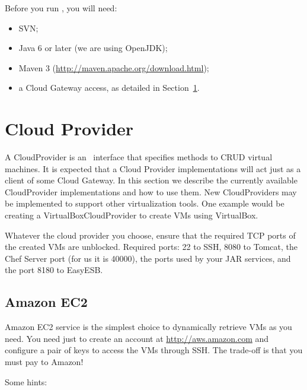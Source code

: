 Before you run \ee, you will need:

\begin{itemize}
\item SVN;
\item Java 6 or later (we are using OpenJDK);
\item Maven 3  (\url{http://maven.apache.org/download.html});
\item a Cloud Gateway access, as detailed in Section~\ref{sec:cloud}.
\end{itemize}

\section{Cloud Provider}
\label{sec:cloud}

A \textsf{CloudProvider} is an \ee\ interface that specifies methods to CRUD virtual machines. It is expected that a \textsf{Cloud Provider} implementations will act just as a client of some Cloud Gateway. In this section we describe the currently available \textsf{CloudProvider} implementations and how to use them. New \textsf{CloudProvider}s may be implemented to support other virtualization tools. One example would be creating a \textsf{VirtualBoxCloudProvider} to create VMs using VirtualBox.

Whatever the cloud provider you choose, ensure that the required TCP ports of the created VMs are unblocked. Required ports: 22 to SSH, 8080 to Tomcat, the Chef Server port (for us it is 40000), the ports used by your JAR services, and the port 8180 to EasyESB.

\subsection{Amazon EC2}

Amazon EC2 service is the simplest choice to dynamically retrieve VMs as you need. You need just to create an account at \url{http://aws.amazon.com} and configure a pair of keys to access the VMs through SSH. The trade-off is that you must pay to Amazon! 

Some hints:

